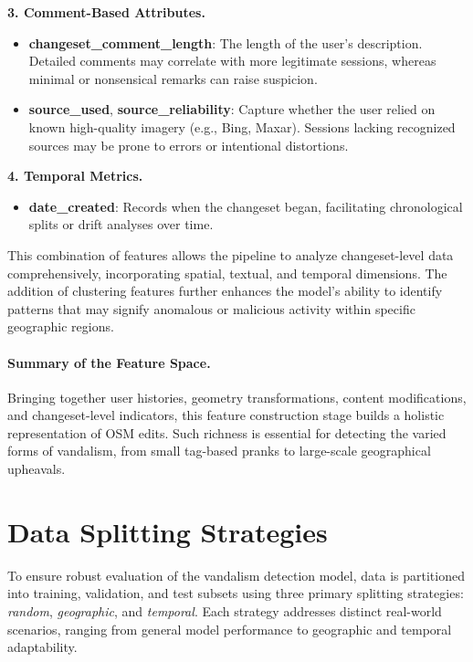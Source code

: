 \documentclass[
    13pt, %
    a4paper, %
    DIV14, %
    listof=totoc, %
    bibliography=totoc, %
    index=totoc, %
    headsepline
]{scrreprt}
\begin{document}
\vspace{1em}
\noindent
\textbf{3. Comment-Based Attributes.}
\begin{itemize}
  \item \textbf{changeset\_comment\_length}: The length of the user’s description. Detailed comments may correlate with more legitimate sessions, whereas minimal or nonsensical remarks can raise suspicion.
  \item \textbf{source\_used}, \textbf{source\_reliability}: Capture whether the user relied on known high-quality imagery (e.g., Bing, Maxar). Sessions lacking recognized sources may be prone to errors or intentional distortions.
\end{itemize}

\vspace{1em}
\noindent
\textbf{4. Temporal Metrics.}
\begin{itemize}
  \item \textbf{date\_created}: Records when the changeset began, facilitating chronological splits or drift analyses over time.
\end{itemize}

\vspace{1em}
\noindent This combination of features allows the pipeline to analyze changeset-level data comprehensively, incorporating spatial, textual, and temporal dimensions. The addition of clustering features further enhances the model’s ability to identify patterns that may signify anomalous or malicious activity within specific geographic regions.

\vspace{1em}

\paragraph{Summary of the Feature Space.}
Bringing together user histories, geometry transformations, content modifications, and changeset-level indicators, this feature construction stage builds a holistic representation of OSM edits. Such richness is essential for detecting the varied forms of vandalism, from small tag-based pranks to large-scale geographical upheavals.


\section{Data Splitting Strategies}
\label{sec:data_splitting}

To ensure robust evaluation of the vandalism detection model, data is partitioned into training, validation, and test subsets using three primary splitting strategies: \textit{random}, \textit{geographic}, and \textit{temporal}. Each strategy addresses distinct real-world scenarios, ranging from general model performance to geographic and temporal adaptability.
\end{document}
